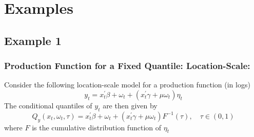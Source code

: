 \documentclass{article}
\begin{document}
\section{Examples}
\subsection{Example 1}
\subsubsection{Production Function for a Fixed Quantile: Location-Scale:}
Consider the following location-scale model for a production function (in logs)
\begin{equation}\label{locationscale}
y_{t}=x_{t}^{'}\beta+\omega_{t}+(x_{t}^{'}\gamma+\mu\omega_{t})\eta_{t}
\end{equation}
The conditional quantiles of $y_{t}$ are then given by
\begin{equation}\label{qlocationscale}
Q_{y}(x_{t}, \omega_{t}, \tau)=x_{t}^{'}\beta+\omega_{t}+(x_{t}^{'}\gamma+\mu\omega_{t})F^{-1}(\tau), \quad \tau\in(0,1)
\end{equation}
where $F$ is the cumulative distribution function of $\eta_{t}$\\
\end{document}
